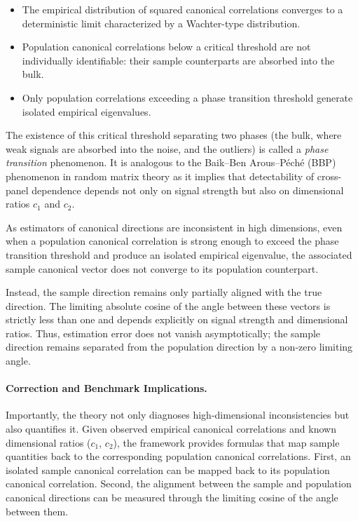 \documentclass[12pt]{report} %
\begin{document}
\begin{itemize}
    \item The empirical distribution of squared canonical correlations converges to a 
	deterministic limit characterized by a Wachter-type distribution.
    \item Population canonical correlations below a critical threshold are not individually 
	identifiable: their sample counterparts are absorbed into the bulk.
    \item Only population correlations exceeding a phase transition threshold generate 
	isolated empirical eigenvalues.
\end{itemize}

The existence of this critical threshold separating two phases (the bulk, where weak 
signals are absorbed into the noise, and the outliers) is called a \emph{phase transition} 
phenomenon. It is analogous to the Baik–Ben Arous–Péché (BBP) phenomenon 
in random matrix theory as it implies that detectability of cross-panel dependence 
depends not only on signal strength but also on dimensional ratios $c_1$ and $c_2$.

As estimators of canonical directions are inconsistent in high dimensions, even when a 
population canonical correlation is strong enough to exceed the phase transition threshold 
and produce an isolated empirical eigenvalue, the associated sample canonical vector 
does not converge to its population counterpart.

Instead, the sample direction remains only partially aligned with the true direction. 
The limiting absolute cosine of the angle between these vectors is strictly 
less than one and depends explicitly on signal strength and dimensional ratios. Thus, 
estimation error does not vanish asymptotically; the sample direction remains separated 
from the population direction by a non-zero limiting angle.

\paragraph{Correction and Benchmark Implications.}

Importantly, the theory not only diagnoses high-dimensional inconsistencies but also quantifies it. 
Given observed empirical canonical correlations and known dimensional ratios ($c_1$, $c_2$), 
the framework provides formulas that map sample quantities back to the corresponding 
population canonical correlations. First, an isolated sample canonical correlation can be mapped back to its 
population canonical correlation. Second, the alignment between the sample and population 
canonical directions can be measured through the limiting cosine of the angle between them.
\end{document}
